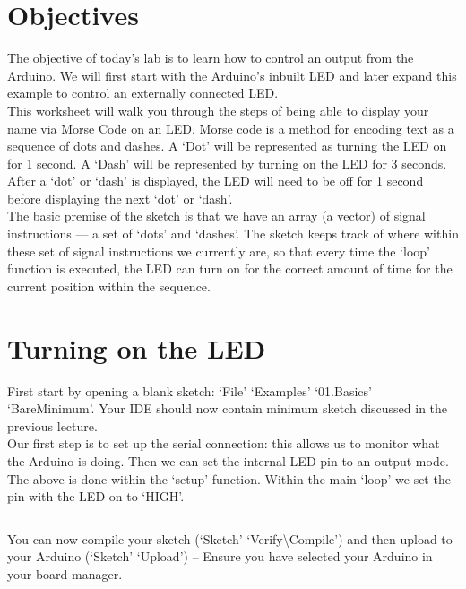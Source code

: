 \documentclass[11pt,a4paper]{article}
\begin{document}
\pagestyle{fancy}

\section*{Objectives}

The objective of today's lab is to learn how to control an output from the Arduino. We will first start with the Arduino's inbuilt LED and later expand this example to control an externally connected LED.\\

\noindent
This worksheet will walk you through the steps of being able to display your name via Morse Code on an LED. Morse code is a method for encoding text as a sequence of dots and dashes. A `Dot' will be represented as turning the LED on for 1 second. A `Dash' will be represented by turning on the LED for 3 seconds. After a `dot' or `dash' is displayed, the LED will need to be off for 1 second before displaying the next `dot' or `dash'.\\

\noindent
The basic premise of the sketch is that we have an array (a vector) of signal instructions --- a set of `dots' and `dashes'. The sketch keeps track of where within these set of signal instructions we currently are, so that every time the `loop' function is executed, the LED can turn on for the correct amount of time for the current position within the sequence.

\section{Turning on the LED}
First start by opening a blank sketch: `File' \textrightarrow `Examples' \textrightarrow `01.Basics' \textrightarrow `BareMinimum'. Your IDE should now contain minimum sketch discussed in the previous lecture.\\

\noindent
Our first step is to set up the serial connection: this allows us to monitor what the Arduino is doing. Then we can set the internal LED pin to an output mode. The above is done within the `setup' function. Within the main `loop' we set the pin with the LED on to `HIGH'.

\inputminted{arduino}{./src/1-led-on.txt}

\noindent
You can now compile your sketch (`Sketch' \textrightarrow `Verify\textbackslash Compile') and then upload to your Arduino (`Sketch' \textrightarrow `Upload') -- Ensure you have selected your Arduino in your board manager.
\end{document}
